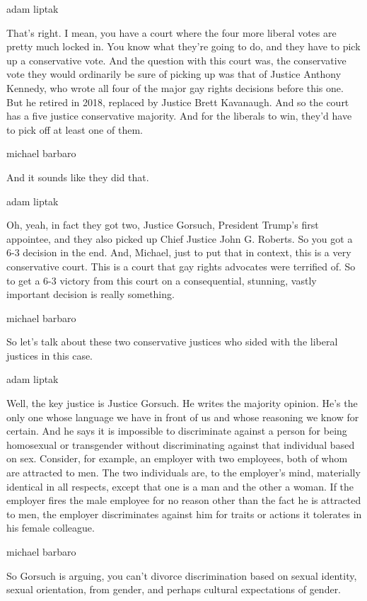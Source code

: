 adam liptak

That's right. I mean, you have a court where the four more liberal votes
are pretty much locked in. You know what they're going to do, and they
have to pick up a conservative vote. And the question with this court
was, the conservative vote they would ordinarily be sure of picking up
was that of Justice Anthony Kennedy, who wrote all four of the major gay
rights decisions before this one. But he retired in 2018, replaced by
Justice Brett Kavanaugh. And so the court has a five justice
conservative majority. And for the liberals to win, they'd have to pick
off at least one of them.

michael barbaro

And it sounds like they did that.

adam liptak

Oh, yeah, in fact they got two, Justice Gorsuch, President Trump's first
appointee, and they also picked up Chief Justice John G. Roberts. So you
got a 6-3 decision in the end. And, Michael, just to put that in
context, this is a very conservative court. This is a court that gay
rights advocates were terrified of. So to get a 6-3 victory from this
court on a consequential, stunning, vastly important decision is really
something.

michael barbaro

So let's talk about these two conservative justices who sided with the
liberal justices in this case.

adam liptak

Well, the key justice is Justice Gorsuch. He writes the majority
opinion. He's the only one whose language we have in front of us and
whose reasoning we know for certain. And he says it is impossible to
discriminate against a person for being homosexual or transgender
without discriminating against that individual based on sex. Consider,
for example, an employer with two employees, both of whom are attracted
to men. The two individuals are, to the employer's mind, materially
identical in all respects, except that one is a man and the other a
woman. If the employer fires the male employee for no reason other than
the fact he is attracted to men, the employer discriminates against him
for traits or actions it tolerates in his female colleague.

michael barbaro

So Gorsuch is arguing, you can't divorce discrimination based on sexual
identity, sexual orientation, from gender, and perhaps cultural
expectations of gender.

